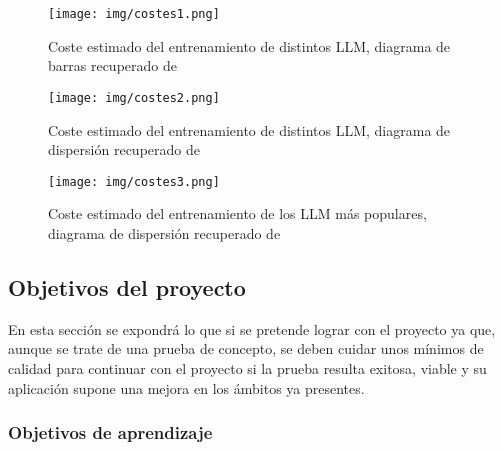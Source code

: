 \begin{figure}[h!]
    \centering
    \texttt{[image: img/costes1.png]}
    \caption{Coste estimado del entrenamiento de distintos LLM, diagrama de barras recuperado de \cite{nestor_maslej_et_al_2024}}
    \label{fig:cost1}
\end{figure}

\begin{figure}[h!]
    \centering
    \texttt{[image: img/costes2.png]}
    \caption{Coste estimado del entrenamiento de distintos LLM, diagrama de dispersión recuperado de \cite{nestor_maslej_et_al_2024}}
    \label{fig:cost2}
\end{figure}

\begin{figure}[h!]
    \centering
    \texttt{[image: img/costes3.png]}
    \caption{Coste estimado del entrenamiento de los LLM más populares, diagrama de dispersión recuperado de \cite{nestor_maslej_et_al_2024}}
    \label{fig:cost3}
\end{figure}

\FloatBarrier

\subsection{Objetivos del proyecto}

En esta sección se expondrá lo que si se pretende lograr con el proyecto ya que, aunque se trate de una prueba de concepto, se deben cuidar unos mínimos de calidad para continuar con el proyecto si la prueba resulta exitosa, viable y su aplicación supone una mejora en los ámbitos ya presentes.

\subsubsection{Objetivos de aprendizaje}



